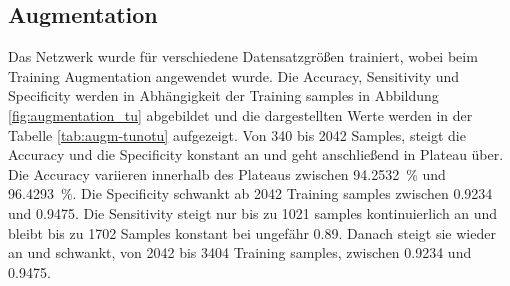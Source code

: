 \subsection{Augmentation}
Das Netzwerk wurde für verschiedene Datensatzgrößen trainiert, wobei beim Training Augmentation angewendet wurde.
Die Accuracy, Sensitivity und Specificity werden in Abhängigkeit der Training samples in Abbildung \ref{fig:augmentation_tu} abgebildet und
die dargestellten Werte werden in der Tabelle \ref{tab:augm-tunotu} aufgezeigt.
Von 340 bis 2042 Samples, steigt die Accuracy und die Specificity konstant an und geht anschließend in Plateau über.
Die Accuracy variieren innerhalb des Plateaus zwischen \SI{94.2532}{\percent} und \SI{96.4293}{\percent}. 
Die Specificity schwankt ab 2042 Training samples zwischen \SI{0.9234}{} und \SI{0.9475}{}.
Die Sensitivity steigt nur bis zu 1021 samples kontinuierlich an und bleibt bis zu 1702 Samples konstant bei ungefähr \SI{0,89}{}.
Danach steigt sie wieder an und schwankt, von 2042 bis 3404 Training samples, zwischen \SI{0.9234}{} und \SI{0.9475}{}. 
